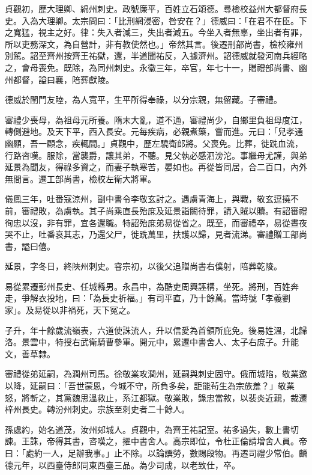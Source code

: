 \begin{pinyinscope}
 貞觀初，歷大理卿、綿州刺史。政號廉平，百姓立石頌德。尋檢校益州大都督府長史。入為大理卿。太宗問曰：「比刑網浸密，咎安在？」德威曰：「在君不在臣。下之寬猛，視主之好。律：失入者減三，失出者減五。今坐入者無辜，坐出者有罪，所以吏務深文，為自營計，非有教使然也。」帝然其言。後遷刑部尚書，檢校雍州別駕。詔至齊州按齊王祐獄，還，半道聞祐反，入據濟州。詔德威就發河南兵經略之，會母喪免。既除，為同州刺史。永徽三年，卒官，年七十一，贈禮部尚書、幽州都督，謚曰襄，陪葬獻陵。



 德威於閨門友睦，為人寬平，生平所得奉祿，以分宗親，無留藏。子審禮。



 審禮少喪母，為祖母元所養。隋末大亂，道不通，審禮尚少，自鄉里負祖母度江，轉側避地。及天下平，西入長安。元每疾病，必親煮藥，嘗而進。元曰：「兒孝通幽顯，吾一顧念，疾輒間。」貞觀中，歷左驍衛郎將。父喪免。比葬，徙跣血流，行路咨嘆。服除，當襲爵，讓其弟，不聽。見父執必感泗滂沱。事繼母尤謹，與弟延景為聞友，得祿多資之，而妻子執寒苦，晏如也。再從皆同居，合二百口，內外無間言。遷工部尚書，檢校左衛大將軍。



 儀鳳三年，吐番寇涼州，副中書令李敬玄討之。遇虜青海上，與戰，敬玄逗撓不前，審禮敗，為虜執。其子尚乘直長殆庶及延景詣闕待罪，請入賊以贖。有詔審禮徇忠以沒，非有罪，宜各還職。特詔殆庶弟易從省之。既至，而審禮卒，易從晝夜哭不止，吐番哀其志，乃還父尸，徙跣萬里，扶護以歸，見者流涕。審禮贈工部尚書，謚曰僖。



 延景，字冬日，終陜州刺史。睿宗初，以後父追贈尚書右僕射，陪葬乾陵。



 易從累遷彭州長史、任城縣男。永昌中，為酷吏周興誣構，坐死。將刑，百姓奔走，爭解衣投地，曰：「為長史祈福。」有司平直，乃十餘萬。當時號「孝義劉家」。及易從以非禍死，天下冤之。



 子升，年十餘歲流嶺表，六道使誅流人，升以信愛為首領所庇免。後易姓溫，北歸洛。景雲中，特授右武衛騎曹參軍。開元中，累遷中書舍人、太子右庶子。升能文，善草隸。



 審禮從弟延嗣，為潤州司馬。徐敬業攻潤州，延嗣與刺史固守。俄而城陷，敬業邀以降，延嗣曰：「吾世蒙恩，今城不守，所負多矣，詎能茍生為宗族羞？」敬業怒，將斬之，其黨魏思溫救止，系江都獄。敬業敗，錄忠當敘，以裴炎近親，裁遷梓州長史。轉汾州刺史。宗族至刺史者二十餘人。



 孫處約，始名道茂，汝州郟城人。貞觀中，為齊王祐記室。祐多過失，數上書切諫。王誅，帝得其書，咨嘆之，擢中書舍人。高宗即位，令杜正倫請增舍人員。帝曰：「處約一人，足辦我事。」止不除。以論譔勞，數賜段物。再遷司禮少常伯。麟德元年，以西臺侍郎同東西臺三品。為少司成，以老致仕，卒。




\end{pinyinscope}

